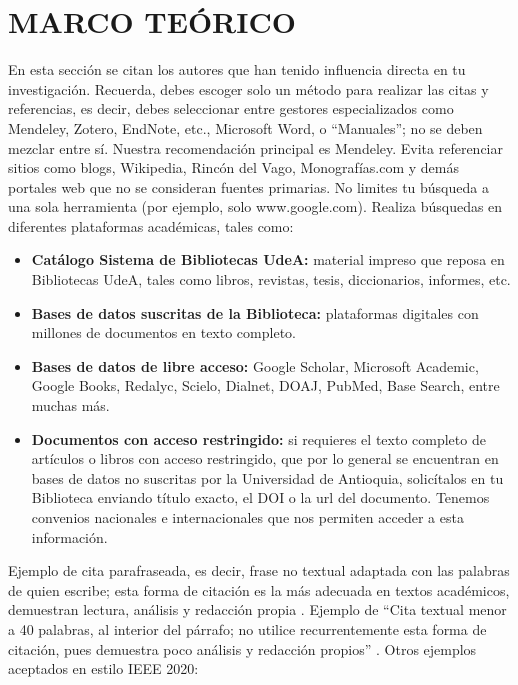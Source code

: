 \section{MARCO TEÓRICO}


En esta sección se citan los autores que han tenido influencia directa en tu investigación. Recuerda, debes escoger solo un método para realizar las citas y referencias, es decir, debes seleccionar entre gestores especializados como Mendeley, Zotero, EndNote, etc., Microsoft Word, o “Manuales”; no se deben mezclar entre sí. Nuestra recomendación principal es Mendeley. Evita referenciar sitios como blogs, Wikipedia, Rincón del Vago, Monografías.com y demás portales web que no se consideran fuentes primarias. No limites tu búsqueda a una sola herramienta (por ejemplo, solo www.google.com). Realiza búsquedas en diferentes plataformas académicas, tales como:

\begin{itemize}
    \item \textbf{Catálogo Sistema de Bibliotecas UdeA:} material impreso que reposa en Bibliotecas UdeA, tales como libros, revistas, tesis, diccionarios, informes, etc.
    \item\textbf{Bases de datos suscritas de la Biblioteca:} plataformas digitales con millones de documentos en texto completo.
    \item\textbf{Bases de datos de libre acceso:} Google Scholar, Microsoft Academic, Google Books, Redalyc, Scielo, Dialnet, DOAJ, PubMed, Base Search, entre muchas más.
    \item\textbf{Documentos con acceso restringido:} si requieres el texto completo de artículos o libros con acceso restringido, que por lo general se encuentran en bases de datos no suscritas por la Universidad de Antioquia, solicítalos en tu Biblioteca enviando título exacto, el DOI o la url del documento. Tenemos convenios nacionales e internacionales que nos permiten acceder a esta información.
\end{itemize}

Ejemplo de cita parafraseada, es decir, frase no textual adaptada con las palabras de quien escribe; esta forma de citación es la más adecuada en textos académicos, demuestran lectura, análisis y redacción propia \cite{sec:pediatria}. Ejemplo de “Cita textual menor a 40 palabras, al interior del párrafo; no utilice recurrentemente esta forma de citación, pues demuestra poco análisis y redacción propios” \cite[p. 9]{opc:ramirez}. Otros ejemplos aceptados en estilo IEEE 2020:

